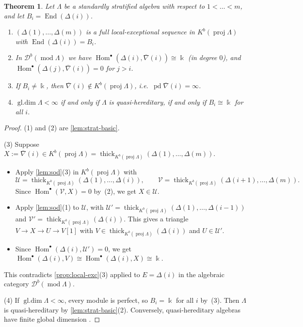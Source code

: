 \documentclass[11pt,reqno]{amsart}
\theoremstyle{plain}
\newtheorem{theorem}{Theorem}[section]
\theoremstyle{definition}
\theoremstyle{remark}
\newcommand{\kk}{\Bbbk}
\DeclareMathOperator{\Hom}{Hom}
\DeclareMathOperator{\End}{End}
\DeclareMathOperator{\gldim}{gl.dim}
\DeclareMathOperator{\pd}{pd}
\newcommand{\modd}{\operatorname{mod}}
\newcommand{\proj}{\operatorname{proj}}
\newcommand{\Db}{\mathcal{D}^b}
\newcommand{\Kb}{K^b}
\newcommand{\thick}[2][\cD]{\operatorname{thick}_{#1}(#2)}
\newcommand{\nablabar}{\overline{\nabla}}
\newcommand{\cD}{\mathcal{D}}
\newcommand{\cU}{\mathcal{U}}
\newcommand{\cV}{\mathcal{V}}
\begin{document}
\begin{theorem}\label{thm:C}
Let $\Lambda$ be a standardly stratified algebra with respect to $1<\dots<m$, and let $B_i=\End(\Delta(i))$.
\begin{enumerate}
\item $(\Delta(1),\dots,\Delta(m))$ is a full local-exceptional sequence in $\Kb(\proj\Lambda)$ with $\End(\Delta(i))=B_i$.
\item In $\Db(\modd\Lambda)$ we have $\Hom^\bullet(\Delta(i),\nablabar(i))\cong\kk$ (in degree $0$), and $\Hom^\bullet(\Delta(j),\nablabar(i))=0$ for $j>i$.
\item If $B_i\ne\kk$, then $\nablabar(i)\notin\Kb(\proj\Lambda)$, i.e.\ $\pd\nablabar(i)=\infty$.
\item $\gldim\Lambda<\infty$ if and only if $\Lambda$ is quasi-hereditary, if and only if $B_i\cong\kk$ for all $i$.
\end{enumerate}
\end{theorem}

\begin{proof}
(1) and (2) are \cref{lem:strat-basic}.

(3) Suppose $X:=\nablabar(i)\in\Kb(\proj\Lambda)=\thick[\Kb(\proj\Lambda)]{\Delta(1),\dots,\Delta(m)}$.
\begin{itemize}
\item Apply \cref{lem:sod}(3) in $\Kb(\proj\Lambda)$ with
\[\cU=\thick[\Kb(\proj\Lambda)]{\Delta(1),\dots,\Delta(i)},\qquad\cV=\thick[\Kb(\proj\Lambda)]{\Delta(i+1),\dots,\Delta(m)}.\]
Since $\Hom^\bullet(\cV,X)=0$ by~(2), we get $X\in\cU$.
\item Apply \cref{lem:sod}(1) to $\cU$, with $\cU'=\thick[\Kb(\proj\Lambda)]{\Delta(1),\dots,\Delta(i-1)}$ and $\cV'=\thick[\Kb(\proj\Lambda)]{\Delta(i)}$. This gives a triangle $V\to X\to U\to V[1]$ with $V\in\thick[\Kb(\proj\Lambda)]{\Delta(i)}$ and $U\in\cU'$.
\item Since $\Hom^\bullet(\Delta(i),\cU')=0$, we get $\Hom^\bullet(\Delta(i),V)\cong\Hom^\bullet(\Delta(i),X)\cong\kk$.
\end{itemize}
This contradicts \cref{prop:local-exc}(3) applied to $E=\Delta(i)$ in the algebraic category $\Db(\modd\Lambda)$.

(4) If $\gldim\Lambda<\infty$, every module is perfect, so $B_i=\kk$ for all $i$ by~(3). Then $\Lambda$ is quasi-hereditary by \cref{lem:strat-basic}(2). Conversely, quasi-hereditary algebras have finite global dimension \cite{CPS88,DR92}.
\end{proof}
\end{document}
